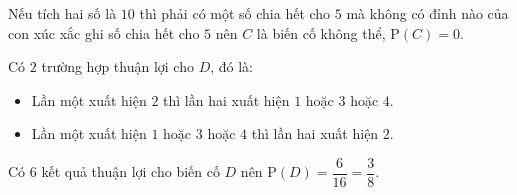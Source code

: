 \begin{vd}
{\begin{listEX}
			\item Nếu tích hai số là $10$ thì phải có một số chia hết cho $5$ mà không có đỉnh nào của con xúc xắc ghi số chia hết cho $5$ nên $C$ là biến cố không thể, $\mathrm{P}(C)=0$.
			\item Có $2$ trường hợp thuận lợi cho $D$, đó là: 
			\begin{itemize}
				\item Lần một xuất hiện $2$ thì lần hai xuất hiện $1$ hoặc $3$ hoặc $4$.
				\item Lần một xuất hiện $1$ hoặc $3$ hoặc $4$ thì lần hai xuất hiện $2$.
			\end{itemize}
			Có $6$ kết quả thuận lợi cho biến cố $D$ nên $\mathrm{P}(D)=\dfrac{6}{16}=\dfrac{3}{8}$.
		\end{listEX}
	}
\end{vd}

